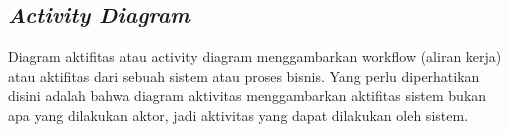 \begin{sloppypar}
\subsection{\textit{Activity Diagram}}
\noindent

Diagram aktifitas atau activity diagram
menggambarkan workflow (aliran kerja) atau 
aktifitas dari sebuah sistem atau proses bisnis. 
Yang perlu diperhatikan disini adalah bahwa 
diagram aktivitas menggambarkan aktifitas 
sistem bukan apa yang dilakukan aktor, jadi 
aktivitas yang dapat dilakukan oleh sistem\parencite{mandiri2013pembuatan}.

\end{sloppypar}





